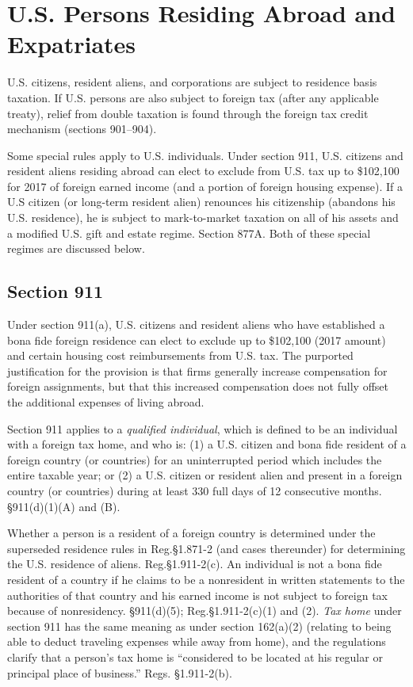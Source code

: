 \chapter{U.S. Persons Residing Abroad and Expatriates}

U.S. citizens, resident aliens, and corporations are subject to residence basis taxation.  If U.S. persons are also subject to foreign tax (after any applicable treaty), relief from double taxation is found through the foreign tax credit mechanism (sections 901--904).

Some special rules apply to U.S. individuals.  Under section 911, U.S. citizens and resident aliens residing abroad can elect to exclude from U.S. tax up to \$102,100 for 2017 of foreign earned income (and a portion of foreign housing expense).  If a U.S citizen (or long-term resident alien) renounces his citizenship (abandons his U.S. residence), he is subject to mark-to-market taxation on all of his assets and a modified U.S. gift and estate regime.  Section 877A.  Both of these special regimes are discussed below.

\section{Section 911}
	

Under section 911(a), U.S. citizens and resident aliens who have established a bona fide foreign residence can elect to exclude up to \$102,100 (2017 amount) and certain housing cost reimbursements from U.S. tax.   The purported justification for the provision is that firms generally increase compensation for foreign assignments, but that this increased compensation does not fully offset the additional expenses of living abroad.
 
Section 911 applies to a \emph{qualified individual}, which is defined to be an individual with a foreign tax home, and who is: (1) a U.S. citizen and bona fide resident of a foreign country (or countries) for an uninterrupted period which includes the entire taxable year; or (2) a U.S. citizen or resident alien and present in a foreign country (or countries) during at least 330 full days of 12 consecutive months. \S911(d)(1)(A) and (B).  

Whether a person is a resident of a foreign country is determined under the superseded residence rules in Reg.\@ \S1.871-2 (and cases thereunder) for determining the U.S. residence of aliens.  Reg.\@ \S1.911-2(c).  An individual is not a bona fide resident of a country if he claims to be a nonresident in written statements to the authorities of that country and his earned income is not subject to foreign tax because of nonresidency.  \S911(d)(5); Reg.\@ \S1.911-2(c)(1) and (2).  \emph{Tax home} under section 911 has the same meaning as under section 162(a)(2) (relating to being able to deduct traveling expenses while away from home), and the regulations clarify that a person's tax home is ``considered to be located at his regular or principal place of business.''  Regs. \S1.911-2(b).  
 
